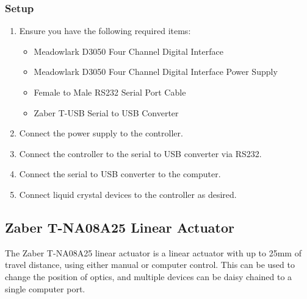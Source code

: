 \documentclass[11pt, letterpaper, titlepage]{article}
\begin{document}
\subsubsection{Setup} %
\begin{enumerate}
    \item Ensure you have the following required items:
    \begin{itemize}
        \item Meadowlark D3050 Four Channel Digital Interface
        \item Meadowlark D3050 Four Channel Digital Interface Power Supply
        \item Female to Male RS232 Serial Port Cable
        \item Zaber T-USB Serial to USB Converter
    \end{itemize}
    \item Connect the power supply to the controller.
    \item Connect the controller to the serial to USB converter via RS232.
    \item Connect the serial to USB converter to the computer.
    \item Connect liquid crystal devices to the controller as desired.
\end{enumerate}
\subsection{Zaber T-NA08A25 Linear Actuator} %
The Zaber T-NA08A25 linear actuator is a linear actuator with up to 25mm of travel distance, using either manual or computer control.
This can be used to change the position of optics, and multiple devices can be daisy chained to a single computer port.
\end{document}
